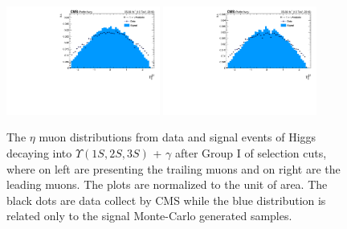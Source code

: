 \begin{figure}[!htbp]
\begin{center}
\includegraphics[width=0.45\textwidth]{figures_and_tables/outputPlots/HtoUpsilon_Cat0_ZZZZZ/au/data_x_mc/noKinCuts/h_noKin_TrailingMu_eta}\hspace*{1.cm}
\includegraphics[width=0.45\textwidth]{figures_and_tables/outputPlots/HtoUpsilon_Cat0_ZZZZZ/au/data_x_mc/noKinCuts/h_noKin_LeadingMu_eta}
\end{center}\vspace*{-.5cm}
\caption{The $\eta$ muon distributions from data and signal events of Higgs decaying into $\Upsilon(1S,2S,3S)$ + $\gamma$ after Group I of selection cuts, where on left are presenting the trailing muons and on right are the leading muons. The plots are normalized to the unit of area. The black dots are data collect by CMS while the blue distribution is related only to the signal Monte-Carlo generated samples.}
\label{fig:etaMuons_HtoUpsilon_Cat0}
\end{figure}


